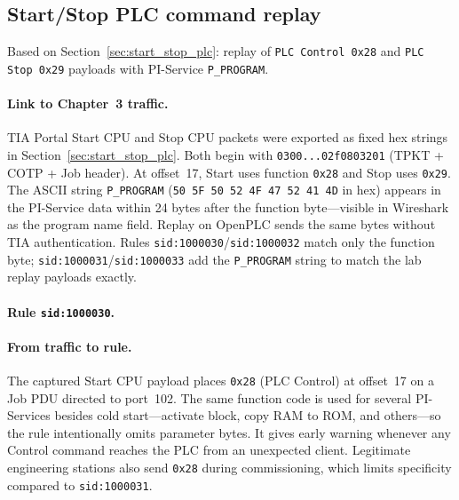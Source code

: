 \subsection{Start/Stop PLC command replay}
\label{sec:rules-start-stop}

Based on Section~\ref{sec:start_stop_plc}: replay of \texttt{PLC Control 0x28} and \texttt{PLC Stop 0x29} payloads with PI-Service \texttt{P\_PROGRAM}.

\paragraph{Link to Chapter~3 traffic.}
TIA Portal Start CPU and Stop CPU packets were exported as fixed hex strings in Section~\ref{sec:start_stop_plc}. Both begin with \texttt{0300...02f0803201} (TPKT + COTP + Job header). At offset~17, Start uses function \texttt{0x28} and Stop uses \texttt{0x29}. The ASCII string \texttt{P\_PROGRAM} (\texttt{50 5F 50 52 4F 47 52 41 4D} in hex) appears in the PI-Service data within 24 bytes after the function byte---visible in Wireshark as the program name field. Replay on OpenPLC sends the same bytes without TIA authentication. Rules \texttt{sid:1000030}/\texttt{sid:1000032} match only the function byte; \texttt{sid:1000031}/\texttt{sid:1000033} add the \texttt{P\_PROGRAM} string to match the lab replay payloads exactly.

\paragraph{Rule \texttt{sid:1000030}.}

\paragraph{From traffic to rule.}
The captured Start CPU payload places \texttt{0x28} (PLC Control) at offset~17 on a Job PDU directed to port~102. The same function code is used for several PI-Services besides cold start---activate block, copy RAM to ROM, and others---so the rule intentionally omits parameter bytes. It gives early warning whenever any Control command reaches the PLC from an unexpected client. Legitimate engineering stations also send \texttt{0x28} during commissioning, which limits specificity compared to \texttt{sid:1000031}.

